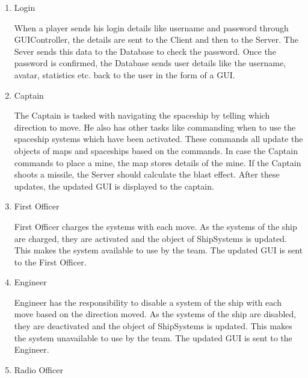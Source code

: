\begin{enumerate}
\item Login


When a player sends his login details like username and password through GUIController, the details are sent to the Client and then to the Server. The Sever sends this data to the Database to check the password. Once the password is confirmed, the Database sends user details like the username, avatar, statistics etc. back to the user in the form of a GUI.

\item Captain


The Captain is tasked with navigating the spaceship by telling which direction to move. He also has other tasks like commanding when to use the spaceship systems which have been activated. These commands all update the objects of maps and spaceships based on the commands. In case the Captain commands to place a mine, the map stores details of the mine. If the Captain shoots a missile, the Server should calculate the blast effect. After these updates, the updated GUI is displayed to the captain.

\item First Officer


First Officer charges the systems with each move. As the systems of the ship are charged, they are activated and the object of ShipSystems is updated. This makes the system available to use by the team. The updated GUI is sent to the First Officer.

\item Engineer


Engineer has the responsibility to disable a system of the ship with each move based on the direction moved. As the systems of the ship are disabled, they are deactivated and the object of ShipSystems is updated. This makes the system unavailable to use by the team. The updated GUI is sent to the Engineer.

\item Radio Officer



\end{enumerate}
